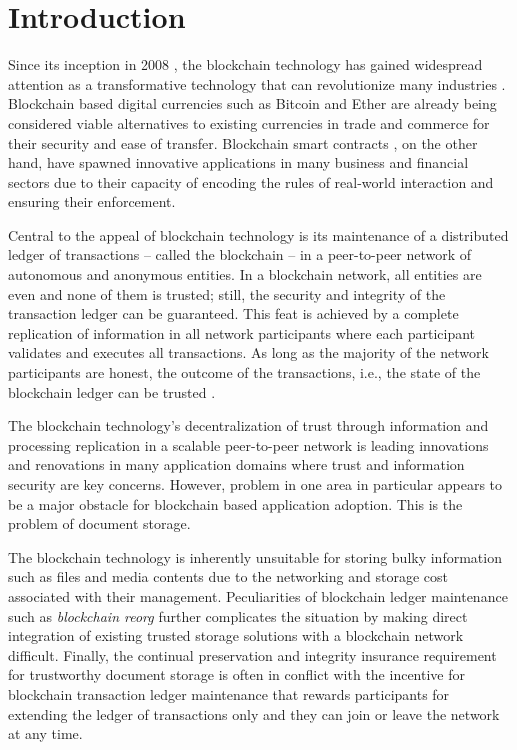 \section{Introduction}
\label{s-intro}
Since its inception in 2008 \cite{bitcoin}, the blockchain technology has gained widespread attention as a transformative technology that can revolutionize many industries \cite{deloitte}. Blockchain based digital currencies such as Bitcoin \cite{bitcoin} and Ether \cite{Wood2014EthereumAS} are already being considered viable alternatives to existing currencies in trade and commerce for their security and ease of transfer. Blockchain smart contracts \cite{FM548} \cite{Wood2014EthereumAS}, on the other hand, have spawned innovative applications in many business and financial sectors due to their capacity of encoding the rules of real-world interaction and ensuring their enforcement.

Central to the appeal of blockchain technology is its maintenance of a distributed ledger of transactions --  called the blockchain -- in a peer-to-peer network of autonomous and anonymous entities. In a blockchain network, all entities are even and none of them is trusted; still, the security and integrity of the transaction ledger can be guaranteed. This feat is achieved by a complete replication of information in all network participants where each participant validates and executes all transactions. As long as the majority of the network participants are honest, the outcome of the transactions, i.e., the state of the blockchain ledger can be trusted \cite{10.1007/978-3-319-56614-6_22}.

The blockchain technology's decentralization of trust through information and processing replication in a scalable peer-to-peer network is leading innovations and renovations in many application domains where trust and information security are key concerns. However, problem in one area in particular appears to be a major obstacle for blockchain based application adoption. This is the problem of document storage. 

The blockchain technology is inherently unsuitable for storing bulky information such as files and media contents due to the networking and storage cost associated with their management. Peculiarities of blockchain ledger maintenance such as \textit{blockchain reorg} \cite{reorg} further complicates the situation by making direct integration of existing trusted storage solutions with a blockchain network difficult. Finally, the continual preservation and integrity insurance requirement for trustworthy document storage is often in conflict with the incentive for blockchain transaction ledger maintenance that rewards participants for extending the ledger of transactions only and they can join or leave the network at any time.      


